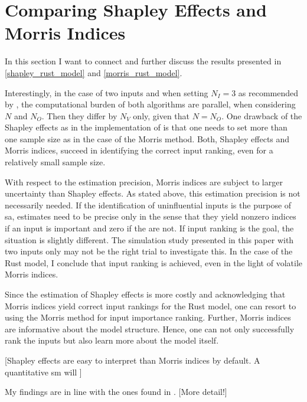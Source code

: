 \section{Comparing Shapley Effects and Morris Indices} \label{comparison}

In this section I want to connect and further discuss the results presented in \cref{shapley_rust_model}
and \cref{morris_rust_model}.

Interestingly, in the case of two inputs and when setting $N_I = 3$ as recommended
by \citet{SNS16}, the computational burden of both algorithms are parallel, when
considering $N$ and $N_O$. Then they differ by $N_V$ only, given that $N = N_O$. One drawback
of the Shapley effects as in the implementation of \citet{SNS16} is that one needs to
set more than one sample size as in the case of the Morris method.
Both, Shapley effects and Morris indices, succeed in identifying the correct input
ranking, even for a relatively small sample size.

With respect to the estimation precision, Morris indices are subject to larger uncertainty
than Shapley effects. As stated above, this estimation precision is not necessarily needed. If
the identification of uninfluential inputs is the purpose of sa, estimates need to be precise
only in the sense that they yield nonzero indices if an input is important and zero if the
are not. If input ranking is the goal, the situation is slightly different. The simulation
study presented in this paper with two inputs only may not be the right trial to investigate
this. In the case of the Rust model, I conclude that input ranking is achieved, even in the
light of volatile Morris indices.

Since the estimation of Shapley effects is more costly and acknowledging that Morris
indices yield correct input rankings for the Rust model, one can resort to using the Morris
method for input importance ranking. Further, Morris indices are informative about the
model structure. Hence, one can not only successfully rank the inputs but also learn more
about the model itself.

[Shapley effects are easy to interpret than Morris indices by default. A quantitative
sm will ]

My findings are in line with the ones found in \citet{GM17}. [More detail!]